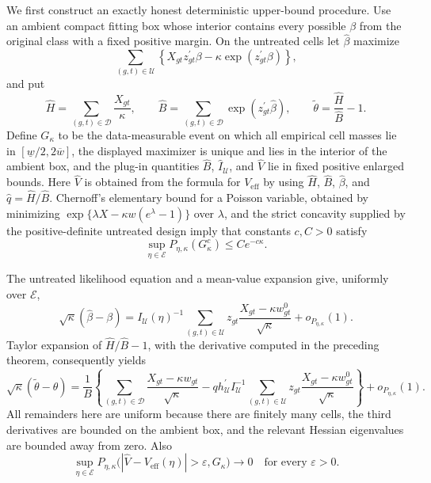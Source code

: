 We first construct an exactly honest deterministic upper-bound procedure.
Use an ambient compact fitting box whose interior contains every possible
\(\beta\) from the original class with a fixed positive margin.  On the
untreated cells let \(\widehat\beta\) maximize
\[
 \sum_{(g,t)\in\mathcal U}
 \left\{X_{gt}z_{gt}^{\prime}\beta
             -\kappa\exp(z_{gt}^{\prime}\beta)\right\},
\]
and put
\[
 \widehat H=\sum_{(g,t)\in\mathcal D}\frac{X_{gt}}{\kappa},
 \qquad
 \widehat B=\sum_{(g,t)\in\mathcal D}
                   \exp(z_{gt}^{\prime}\widehat\beta),
 \qquad
 \widetilde\theta=\frac{\widehat H}{\widehat B}-1.
\]
Define \(G_\kappa\) to be the data-measurable event on which all empirical
cell masses lie in \([\underline w/2,2\overline w]\), the displayed
maximizer is unique and lies in the interior of the ambient box, and the
plug-in quantities \(\widehat B\), \(\widehat I_{\mathcal U}\), and
\(\widehat V\) lie in fixed positive enlarged bounds.  Here
\(\widehat V\) is obtained from the formula for \(V_{\mathrm{eff}}\) by
using \(\widehat H\), \(\widehat B\), \(\widehat\beta\), and
\(\widehat q=\widehat H/\widehat B\).  Chernoff's elementary bound for a
Poisson variable, obtained by minimizing
\(\exp\{\lambda X-\kappa w(e^\lambda-1)\}\) over \(\lambda\), and the
strict concavity supplied by the positive-definite untreated design imply
that constants \(c,C>0\) satisfy
\[
 \sup_{\eta\in\mathcal E}P_{\eta,\kappa}(G_\kappa^c)
 \leq Ce^{-c\kappa}.
\]

The untreated likelihood equation and a mean-value expansion give,
uniformly over \(\mathcal E\),
\[
 \sqrt\kappa(\widehat\beta-\beta)
 =I_{\mathcal U}(\eta)^{-1}
    \sum_{(g,t)\in\mathcal U}
       z_{gt}\frac{X_{gt}-\kappa w^0_{gt}}{\sqrt\kappa}
   +o_{P_{\eta,\kappa}}(1).
\]
Taylor expansion of \(\widehat H/\widehat B-1\), with the derivative
computed in the preceding theorem, consequently yields
\[
 \sqrt\kappa(\widetilde\theta-\theta)
 =\frac{1}{B}\left\{
    \sum_{(g,t)\in\mathcal D}
       \frac{X_{gt}-\kappa w_{gt}}{\sqrt\kappa}
    -q h_{\mathcal U}^{\prime}I_{\mathcal U}^{-1}
       \sum_{(g,t)\in\mathcal U}
          z_{gt}\frac{X_{gt}-\kappa w^0_{gt}}{\sqrt\kappa}
  \right\}+o_{P_{\eta,\kappa}}(1).
\]
All remainders here are uniform because there are finitely many cells, the
third derivatives are bounded on the ambient box, and the relevant Hessian
eigenvalues are bounded away from zero.  Also
\[
 \sup_{\eta\in\mathcal E}
 P_{\eta,\kappa}\bigl(|\widehat V-V_{\mathrm{eff}}(\eta)|>\varepsilon,
 G_\kappa\bigr)\longrightarrow0
 \quad\text{for every }\varepsilon>0.
\]

